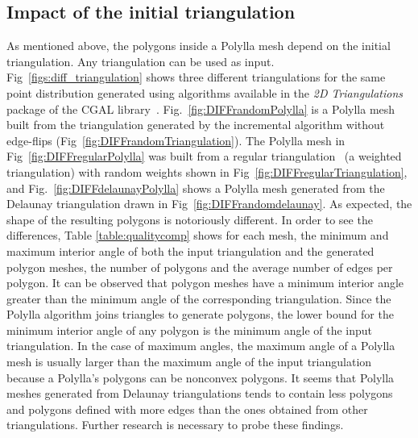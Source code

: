 \documentclass[lineno,pdflatex,sn-mathphys]{sn-jnl}%
\theoremstyle{thmstyleone}%
\theoremstyle{thmstyletwo}%
\theoremstyle{thmstylethree}%
\begin{document}
\subsection{Impact of the initial triangulation}

As mentioned above, the polygons inside a Polylla mesh depend on the initial triangulation. Any triangulation can be used as input.  Fig~\ref{figs:diff_triangulation} shows three different triangulations for the same point distribution generated using  algorithms available in the {\em 2D  Triangulations} package of the CGAL library~\cite{cgal:y-t2-21b}. Fig.~\ref{fig:DIFFrandomPolylla} is a Polylla mesh built from the triangulation generated by the incremental algorithm 
without  edge-flips (Fig~\ref{fig:DIFFrandomTriangulation}). The Polylla mesh in Fig~\ref{fig:DIFFregularPolylla} was built from a regular triangulation~\cite{BOISSONNAT20025} (a weighted triangulation) with random weights shown in Fig~\ref{fig:DIFFregularTriangulation}, and Fig.~\ref{fig:DIFFdelaunayPolylla} shows a Polylla mesh generated from the Delaunay triangulation drawn in Fig~\ref{fig:DIFFrandomdelaunay}. As expected, the shape of the resulting polygons is notoriously different. In order to see the differences, Table \ref{table:qualitycomp} shows for each mesh, the minimum and maximum interior angle of both the input triangulation and the generated polygon meshes, the number of polygons and the average number of edges per polygon. It can be observed that polygon meshes have a minimum interior angle greater than the minimum angle of the corresponding triangulation. Since the Polylla algorithm joins triangles to generate  polygons, the lower bound for the minimum interior angle of any polygon is the minimum angle of the input triangulation. In the case of maximum angles, the maximum angle of a Polylla mesh is usually larger than the maximum angle of the input triangulation because a Polylla's polygons can be nonconvex polygons. It seems that  Polylla meshes generated from  Delaunay triangulations tends to contain less polygons and  polygons defined with more edges than the ones obtained from other triangulations. Further research is necessary to probe these findings.
\end{document}
